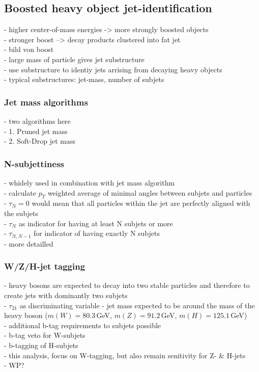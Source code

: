 \subsection{Boosted heavy object jet-identification}
- higher center-of-mass energies -> more strongly boosted objects\\
- stronger boost --> decay products clustered into fat jet \\
- bild von boost \\
- large mass of particle gives jet substructure\\
- use substructure to identiy jets arrising from decaying heavy objects\\
- typical substructures: jet-mass, number of subjets

\subsubsection{Jet mass algorithms}
- two algorithms here \\
- 1. Pruned jet mass\\
- 2. Soft-Drop jet mass
\subsubsection{N-subjettiness}
- whidely used in combination with jet mass algorithm\\
- calculate $p_T$ weighted average of minimal angles between subjets and particles\\
- $\tau_N=0$ would mean that all particles within the jet are perfectly aligned with the subjets\\
- $\tau_N$ as indicator for having at least N subjets or more\\
- $\tau_{N,N-1}$ for indicator of having exactly N subjets\\
- more detailled
\subsubsection{W/Z/H-jet tagging}
- heavy bosons are expected to decay into two stable particles and therefore to create jets with dominantly two subjets\\
- $\tau_{21}$ as discriminating variable
- jet mass expected to be around the mass of the heavy boson ($m(W)=80.3\,$GeV, $m(Z)=91.2\,$GeV, $m(H)=125.1\,$GeV)\\
- additional b-tag requirements to subjets possible\\
- b-tag veto for W-subjets\\
- b-tagging of H-subjets\\
- this analysis, focus on W-tagging, but also remain senitivity for Z- \& H-jets\\
- WP?
